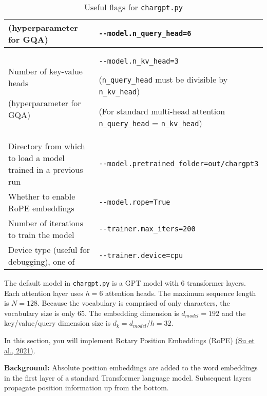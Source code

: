 \documentclass[11pt,addpoints,answers]{exam}
\begin{document}
\begin{questions}
\begin{table}[h!]
\begin{tabular}{|p{0.35\linewidth}|p{0.65\linewidth}|}
(hyperparameter for GQA) &  \lstinline|--model.n_query_head=6| \\ \hline
Number of key-value heads 

(hyperparameter for GQA) &  \lstinline|--model.n_kv_head=3| 

(\lstinline|n_query_head| must be divisible by \lstinline|n_kv_head|) 

(For standard multi-head attention \lstinline|n_query_head| = \lstinline|n_kv_head|)\\ \hline
Directory from which to load a model trained in a previous run &  \lstinline|--model.pretrained_folder=out/chargpt3| \\ \hline
Whether to enable RoPE embeddings &  \lstinline|--model.rope=True| \\ \hline
Number of iterations to train the model & \lstinline|--trainer.max_iters=200| \\ \hline
Device type (useful for debugging), one of  & \lstinline|--trainer.device=cpu| \\ \hline
\end{tabular}
\caption{Useful flags for \lstinline{chargpt.py}}
\label{table:flag}
\end{table}


The default model in \lstinline{chargpt.py} is a GPT model with 6 transformer layers. Each attention layer uses $h=6$ attention heads. The maximum sequence length is $N=128$. Because the vocabulary is comprised of only characters, the vocabulary size is only 65. The embedding dimension is $d_{model} = 192$ and the key/value/query dimension size is $d_k = d_{model}/h =32$. 

\clearpage


    In this section, you will implement Rotary Position Embeddings (RoPE) \href{https://arxiv.org/pdf/2104.09864.pdf}{(Su et al., 2021)}. 


    \textbf{Background:}
    Absolute position embeddings are added to the word embeddings in the first layer of a standard Transformer language model. Subsequent layers propagate position information up from the bottom. 


\end{questions}
\end{document}
